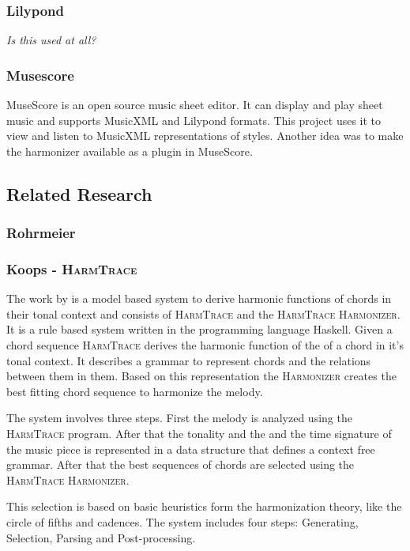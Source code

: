 \subsubsection{Lilypond}
\label{sec:tools.lilypond}

\textit{Is this used at all?}

\subsubsection{Musescore}

MuseScore \cite{musescore} is an open source music sheet editor.
It can display and play sheet music and supports MusicXML and Lilypond formats.
This project uses it to view and listen to MusicXML representations of styles.
Another idea was to make the harmonizer available as a plugin in MuseScore.

\subsection{Related Research}

\subsubsection{Rohrmeier}

\subsubsection{Koops - \textsc{HarmTrace}}
The work by \cite{koops2012} is a model based system to derive harmonic functions of chords in their tonal context and consists of \textsc{HarmTrace} and the \textsc{HarmTrace Harmonizer}. It is a rule based system written in the programming language Haskell. Given a chord sequence \textsc{HarmTrace} derives the harmonic function of the of a chord in it's tonal context. It describes a grammar to represent chords and the relations between them in them. Based on this representation the \textsc{Harmonizer} creates the best fitting chord sequence to harmonize the melody.

The system involves three steps. First the melody is analyzed using the \textsc{HarmTrace} program. After that the tonality and the and the time signature of the music piece is represented in a data structure that defines a context free grammar. After that the best sequences of chords are selected using the \textsc{HarmTrace Harmonizer}. 

This selection is based on basic heuristics form the harmonization theory, like the circle of fifths and cadences. The system includes four steps: Generating, Selection, Parsing and Post-processing. 

